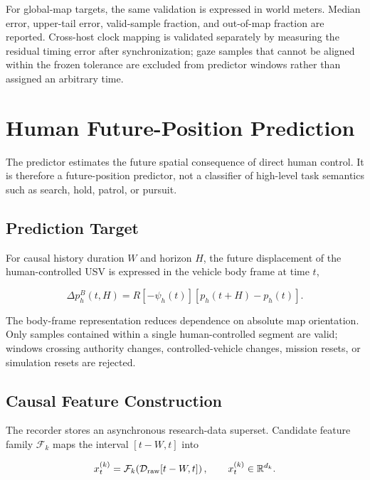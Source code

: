 \documentclass[conference]{IEEEtran}
\begin{document}
For global-map targets, the same validation is expressed in world meters.
Median error, upper-tail error, valid-sample fraction, and out-of-map fraction
are reported. Cross-host clock mapping is validated separately by measuring the
residual timing error after synchronization; gaze samples that cannot be
aligned within the frozen tolerance are excluded from predictor windows rather
than assigned an arbitrary time.

\section{Human Future-Position Prediction}

The predictor estimates the future spatial consequence of direct human
control. It is therefore a future-position predictor, not a classifier of
high-level task semantics such as search, hold, patrol, or pursuit.

\subsection{Prediction Target}

For causal history duration $W$ and horizon $H$, the future displacement of the
human-controlled USV is expressed in the vehicle body frame at time $t$,

\begin{equation}
\Delta p_h^B(t,H)=
R[-\psi_h(t)]\left[p_h(t+H)-p_h(t)\right].
\label{eq:prediction_target}
\end{equation}

The body-frame representation reduces dependence on absolute map orientation.
Only samples contained within a single human-controlled segment are valid;
windows crossing authority changes, controlled-vehicle changes, mission resets,
or simulation resets are rejected.

\subsection{Causal Feature Construction}

The recorder stores an asynchronous research-data superset. Candidate feature
family $\mathcal{F}_k$ maps the interval $[t-W,t]$ into

\begin{equation}
x_t^{(k)}=\mathcal{F}_k\!\left(\mathcal{D}_{\rm raw}[t-W,t]\right),
\qquad x_t^{(k)}\in\mathbb{R}^{d_k}.
\label{eq:feature_mapping}
\end{equation}
\end{document}
